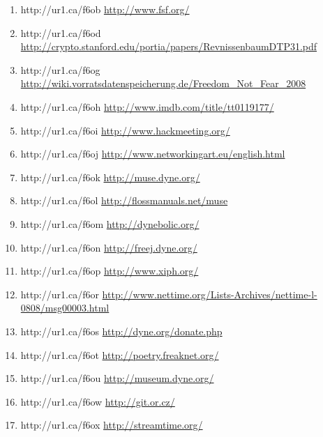 \begin{enumerate}
    \item{http://ur1.ca/f6ob}
        \url{http://www.fsf.org/}

    \item{http://ur1.ca/f6od}
        \url{http://crypto.stanford.edu/portia/papers/RevnissenbaumDTP31.pdf}

    \item{http://ur1.ca/f6og}
        \url{http://wiki.vorratsdatenspeicherung.de/Freedom\_Not\_Fear\_2008}

    \item{http://ur1.ca/f6oh}
        \url{http://www.imdb.com/title/tt0119177/}

    \item{http://ur1.ca/f6oi}
        \url{http://www.hackmeeting.org/}

    \item{http://ur1.ca/f6oj}
        \url{http://www.networkingart.eu/english.html}

    \item{http://ur1.ca/f6ok}
        \url{http://muse.dyne.org/}

    \item{http://ur1.ca/f6ol}
        \url{http://flossmanuals.net/muse}

    \item{http://ur1.ca/f6om}
        \url{http://dynebolic.org/}

    \item{http://ur1.ca/f6on}
        \url{http://freej.dyne.org/}

    \item{http://ur1.ca/f6op}
        \url{http://www.xiph.org/}

    \item{http://ur1.ca/f6or}
        \url{http://www.nettime.org/Lists-Archives/nettime-l-0808/msg00003.html}

    \item{http://ur1.ca/f6os}
        \url{http://dyne.org/donate.php}

    \item{http://ur1.ca/f6ot}
        \url{http://poetry.freaknet.org/}

    \item{http://ur1.ca/f6ou}
        \url{http://museum.dyne.org/}

    \item{http://ur1.ca/f6ow}
        \url{http://git.or.cz/}

    \item{http://ur1.ca/f6ox}
        \url{http://streamtime.org/}


\end{enumerate}
